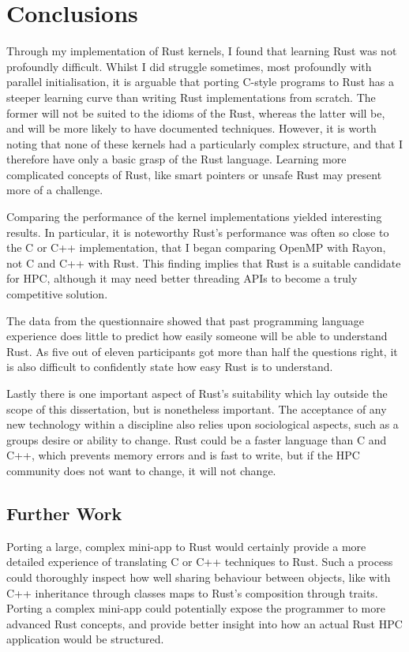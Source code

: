 \chapter{Conclusions}
Through my implementation of Rust kernels, I found that learning Rust was not profoundly difficult. Whilst I did struggle sometimes, most profoundly with parallel initialisation, it is arguable that porting C-style programs to Rust has a steeper learning curve than writing Rust implementations from scratch. The former will not be suited to the idioms of the Rust, whereas the latter will be, and will be more likely to have documented techniques. However, it is  worth noting that none of these kernels had a particularly complex structure, and that I therefore have only a basic grasp of the Rust language. Learning more complicated concepts of Rust, like smart pointers or unsafe Rust may present more of a challenge.

Comparing the performance of the kernel implementations yielded interesting results. In particular, it is noteworthy Rust's performance was often so close to the C or C++ implementation, that I began comparing OpenMP with Rayon, not C and C++ with Rust. This finding implies that Rust is a suitable candidate for HPC, although it may need better threading APIs to become a truly competitive solution.

The data from the questionnaire showed that past programming language experience does little to predict how easily someone will be able to understand Rust. As five out of eleven participants got more than half the questions right, it is also difficult to confidently state how easy Rust is to understand. 

Lastly there is one important aspect of Rust's suitability which lay outside the scope of this dissertation, but is nonetheless important. The acceptance of any new technology within a discipline also relies upon sociological aspects, such as a groups desire or ability to change. Rust could be a faster language than C and C++, which prevents memory errors and is fast to write, but if the HPC community does not want to change, it will not change.

\section{Further Work}\label{sec:furth}
Porting a large, complex mini-app to Rust would certainly provide a more detailed experience of translating C or C++ techniques to Rust. Such a process could thoroughly inspect how well sharing behaviour between objects, like with C++ inheritance through classes maps to Rust's composition through traits. Porting a complex mini-app could potentially expose the programmer to more advanced Rust concepts, and provide better insight into how an actual Rust HPC application would be structured.

